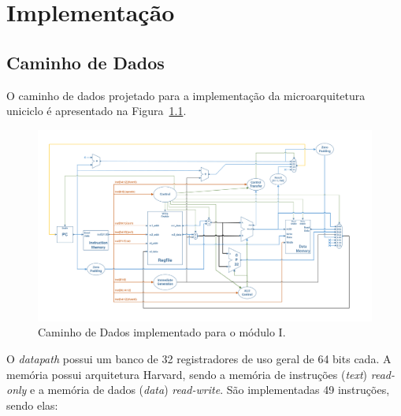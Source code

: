 \chapter{Implementação}\label{CapImpl}



    \section{Caminho de Dados}

        {O caminho de dados projetado para a implementação da microarquitetura uniciclo é apresentado na Figura~\ref{fig:datapath}.}

        \begin{figure}[H]
        \centering
            \includegraphics[width=1\linewidth]{images/singlecycle.png}
            \caption{Caminho de Dados implementado para o módulo I.}\label{fig:datapath}
        \end{figure}

        {O \textit{datapath} possui um banco de 32 registradores de uso geral de 64 bits cada. A memória possui arquitetura Harvard, sendo a memória de instruções (\textit{text}) \textit{read-only} e a memória de dados (\textit{data}) \textit{read-write}. São implementadas 49 instruções, sendo elas:}

